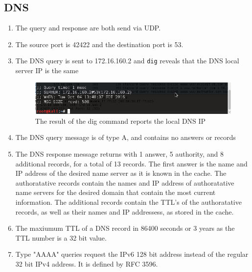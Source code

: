\documentclass[12pt]{article}
\begin{document}
\subsection{DNS}
\begin{enumerate}[label=\textbf{Question \arabic*)}, resume]
	\item The query and response are both send via UDP.
	\item The source port is 42422 and the destination port is 53.
	\item The DNS query is sent to 172.16.160.2 and \texttt{dig} reveals that the DNS local server IP is the same
		\begin{figure}[h]
			\caption{The result of the dig command reports the local DNS IP }
			\centering
			\includegraphics[scale = 0.75]{DNS_IP}
		\end{figure}
	\item The DNS query message is of type A, and contains no answers or records
	\item The DNS response message returns with 1 answer, 5 authority, and 8 additional records, for a total of 13 records. The first answer is the name and IP address of the desired name server as it is known in the cache. The authoratative records contain the names and IP address of authoratative name servers for the desired domain that contain the most current information. The additional records contain the TTL's of the authoratative records, as well as their names and IP addressess, as stored in the cache. 
	\item The maxiumum TTL of a DNS record in 86400 seconds or 3 years as the TTL number is a 32 bit value.
	\item Type "AAAA" queries request the IPv6 128 bit address instead of the regular 32 bit IPv4 address. It is defined by RFC 3596.
\end{enumerate}
\end{document}
